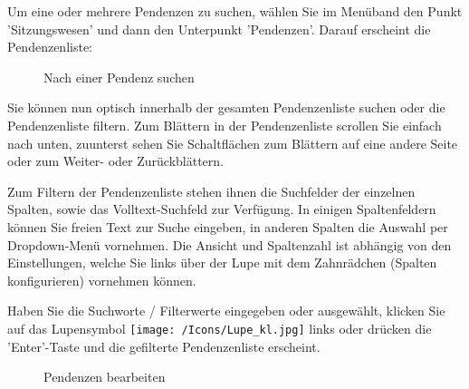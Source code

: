 \vspace{\baselineskip}

Um eine oder mehrere Pendenzen zu suchen, wählen Sie im Menüband den Punkt 'Sitzungswesen' und dann den Unterpunkt 'Pendenzen'. Darauf erscheint die Pendenzenliste:

\begin{figure}[H]
\caption{Nach einer Pendenz suchen}
\end{figure}

Sie können nun optisch innerhalb der gesamten Pendenzenliste suchen oder die Pendenzenliste filtern. Zum Blättern in der Pendenzenliste scrollen Sie einfach nach unten, zuunterst sehen Sie Schaltflächen zum Blättern auf eine andere Seite oder zum Weiter- oder Zurückblättern.

\begin{figure}[H]
\end{figure}

Zum Filtern der Pendenzenliste stehen ihnen die Suchfelder der einzelnen Spalten, sowie das Volltext-Suchfeld zur Verfügung. In einigen Spaltenfeldern können Sie freien Text zur Suche eingeben, in anderen Spalten die Auswahl per Dropdown-Menü vornehmen. Die Ansicht und Spaltenzahl ist abhängig von den Einstellungen, welche Sie links über der Lupe mit dem Zahnrädchen (Spalten konfigurieren) vornehmen können.

\vspace{\baselineskip}

Haben Sie die Suchworte / Filterwerte eingegeben oder ausgewählt, klicken Sie auf das Lupensymbol \texttt{[image: /Icons/Lupe\_kl.jpg]}  links oder drücken die 'Enter'-Taste und die gefilterte Pendenzenliste erscheint.

\begin{figure}[H]
\caption{Pendenzen bearbeiten}
\end{figure}

